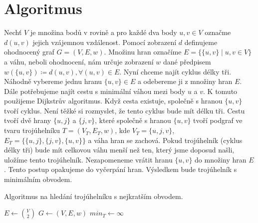 \section{Algoritmus}
\label{sec:algoritmus}

Nechť $V$ je množina bodů v rovině a pro každé dva body $u, v \in V$ označme $d(u, v)$ jejich vzájemnou vzdálenost. Pomocí zobrazení $d$ definujeme ohodnocený graf $G = (V, E, w)$. Množinu hran označíme $E = \{\{u, v\} \mid u, v \in V\}$ a váhu, neboli ohodnocení, nám určuje zobrazení $w$ dané předpisem $w(\{u, v\}) \coloneqq d(u, v), \forall (u, v) \in E$. Nyní chceme najít cyklus délky tři. Náhodně vybereme jednu hranu $\{u, v\} \in E$ a odebereme ji z množiny hran $E$. Dále potřebujeme najít cestu s minimální váhou mezi body $u$ a  $v$. K tomuto použijeme Dijkstrův algoritmus. Když cesta existuje, společně s hranou $\{u, v\}$ tvoří cyklus. Není těžké si rozmyslet, že tento cyklus bude mít délku tři. Cestu tvoří dvě hrany $\{u, j\}$ a $\{j, v\}$, které společně s hranou $\{u, v\}$ tvoří podgraf ve tvaru trojúhelníku $T = (V_T, E_T, w)$, kde $V_T = \{u, j, v\}$, $E_T = \{\{u,j\}, \{j,v\}, \{u,v\}\}$ a váha hran se zachová. Pokud trojúhelník (cyklus délky tři) bude mít celkovou váhu menší než ten, který jsme doposud našli, uložíme tento trojúhelník.
Nezapomeneme vrátit hranu $\{u, v\}$ do množiny hran $E$. Tento postup opakujeme do vyčerpání hran. Výsledkem bude trojúhelník s minimálním obvodem.

\begin{algorithm}
    \caption{Algoritmus na hledání trojúhelníku s nejkratším obvodem.}
    \label{alg:algoritmus}
   
   
    \BlankLine
    
    $ E \leftarrow{\binom{V}{2}}$\;
    $ G \leftarrow (V, E, w)$\;
    $min_T \leftarrow \infty$\;
    \;
   \end{algorithm}